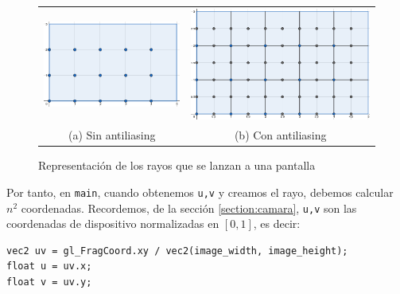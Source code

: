 \begin{figure}[ht]
    \centering
    \begin{tabular}{cc}
        \includegraphics[scale=0.35]{img/C8/pixeles-sin-antiliasing.png} &
      \includegraphics[scale=0.243]{img/C8/pixeles-con-antiliasing.png} \\    
    (a) Sin antiliasing & (b) Con antiliasing  \\
    \end{tabular}
    \caption{Representación de los rayos que se lanzan a una pantalla}
    \label{fig:pantalla-antiliasing}
\end{figure}

Por tanto, en \verb|main|, cuando obtenemos \verb|u,v| y creamos el rayo, debemos calcular $n^2$ coordenadas. Recordemos, de la sección \ref{section:camara}, \verb|u,v| son las coordenadas de dispositivo normalizadas en $[0,1]$, es decir:
\begin{lstlisting}
vec2 uv = gl_FragCoord.xy / vec2(image_width, image_height);
float u = uv.x;
float v = uv.y;
\end{lstlisting}

